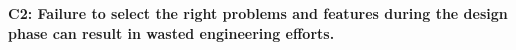 {%
\par \textbf{C2: Failure to select the right problems and features during the design phase can result in wasted engineering efforts.}

}
